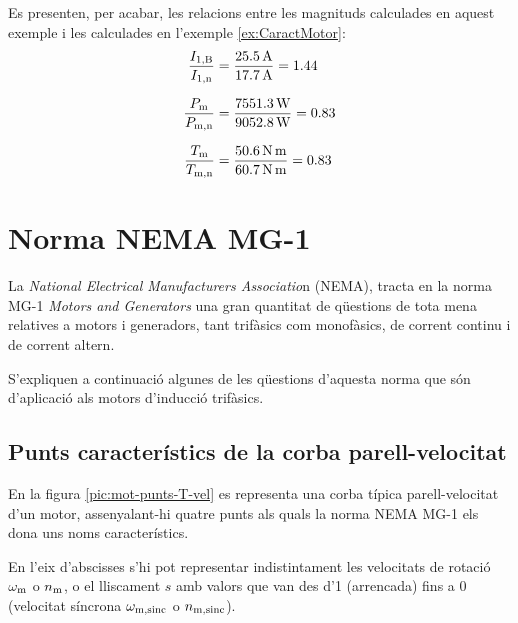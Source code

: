 \begin{exemple}
	Es presenten, per acabar, les relacions entre les magnituds calculades en aquest exemple i les calculades en l'exemple \ref{ex:CaractMotor}:
	\begin{align*}
		\frac{I_\mathrm{1,B}}{I_\mathrm{1,n}} &=  \frac{\qty{25,5}{A}}{\qty{17,7}{A}}= \num{1,44} \\[1.5ex]
		\frac{P_\mathrm{m}}{P_\mathrm{m,n}} &= \frac{\qty{7551,3}{W}}{\qty{9052,8}{W}} = \num{0,83} \\[1.5ex]
		\frac{T_\mathrm{m}}{T_\mathrm{m,n}} &=  \frac{\qty{50,6}{N.m}}{\qty{60,7}{N.m}} = \num{0,83}
	\end{align*}
	
\end{exemple}	    
	    
\section{Norma NEMA MG-1}

La \textit{National Electrical Manufacturers Associatio}n (NEMA),
tracta en la norma  MG-1 \textit{Motors and Generators} una gran quantitat de qüestions de tota mena relatives a motors i generadors, tant trifàsics com monofàsics, de corrent continu i de corrent altern.

S'expliquen a continuació algunes de les qüestions d'aquesta norma que són d'aplicació als motors d'inducció trifàsics.

\subsection{Punts característics de la corba parell-velocitat}

En la figura \vref{pic:mot-punts-T-vel} es representa una corba típica parell-velocitat d'un motor, assenyalant-hi quatre punts als quals la norma NEMA MG-1 els dona uns noms característics. 

En l'eix d'abscisses s'hi pot representar indistintament les velocitats de rotació $\omega_\mathrm{m}$ o $n_\mathrm{m}$, o  el lliscament $s$ amb valors que van des d'1 (arrencada) fins a 0 (velocitat síncrona $\omega_\mathrm{m,sinc}$ o $n_\mathrm{m,sinc}$).

\begin{center}
	
	\label{pic:mot-punts-T-vel}
\end{center}

